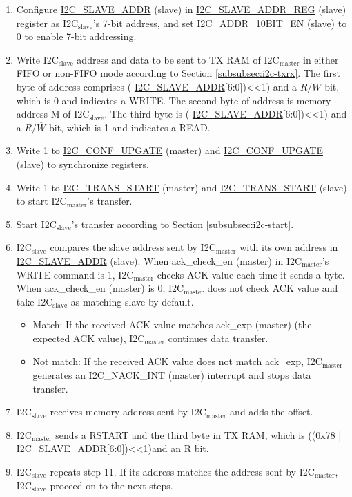 \documentclass[main\_\_EN.tex]{subfiles}
\begin{document}
\begin{enumerate}
\item Configure \hyperref[fielddesc:I2CSLAVEADDR]{I2C\_SLAVE\_ADDR} (slave) in \hyperref[regdesc:I2CSLAVEADDRREG]{I2C\_SLAVE\_ADDR\_REG} (slave) register as I2C$_\text{slave}$'s 7-bit address, and set \hyperref[fielddesc:I2CADDR10BITEN]{I2C\_ADDR\_10BIT\_EN} (slave) to 0 to enable 7-bit addressing.
\item Write I2C$_\text{slave}$ address and data to be sent to TX RAM of I2C$_\text{master}$ in either FIFO or non-FIFO mode according to Section \ref{subsubsec:i2c-txrx}. The first byte of address comprises ( \hyperref[fielddesc:I2CSLAVEADDR]{I2C\_SLAVE\_ADDR}[6:0])<<1) and a $R/\overline W$ bit, which is 0 and indicates a WRITE. The second byte of address is memory address M of I2C$_\text{slave}$. The third byte is ( \hyperref[fielddesc:I2CSLAVEADDR]{I2C\_SLAVE\_ADDR}[6:0])<<1) and a $R/\overline W$ bit, which is 1 and indicates a READ.

\item Write 1 to \hyperref[fielddesc:I2CCONFUPGATE]{I2C\_CONF\_UPGATE} (master) and \hyperref[fielddesc:I2CCONFUPGATE]{I2C\_CONF\_UPGATE} (slave) to synchronize registers.
\item Write 1 to \hyperref[fielddesc:I2CTRANSSTART]{I2C\_TRANS\_START} (master) and \hyperref[fielddesc:I2CTRANSSTART]{I2C\_TRANS\_START} (slave) to start I2C$_\text{master}$'s transfer.
\item Start I2C$_\text{slave}$'s transfer according to Section \ref{subsubsec:i2c-start}.
\item I2C$_\text{slave}$ compares the slave address sent by I2C$_\text{master}$ with its own address in \hyperref[fielddesc:I2CSLAVEADDR]{I2C\_SLAVE\_ADDR} (slave). When ack\_check\_en (master) in I2C$_\text{master}$'s WRITE command is 1, I2C$_\text{master}$ checks ACK value each time it sends a byte. When ack\_check\_en (master) is 0, I2C$_\text{master}$ does not check ACK value and take I2C$_\text{slave}$ as matching slave by default.
\begin{itemize}
\item Match: If the received ACK value matches ack\_exp (master) (the expected ACK value), I2C$_\text{master}$ continues data transfer.
\item Not match: If the received ACK value does not match ack\_exp, I2C$_\text{master}$ generates an I2C\_NACK\_INT (master) interrupt and stops data transfer.
\end{itemize}
\item I2C$_\text{slave}$ receives memory address sent by I2C$_\text{master}$ and adds the offset.
\item I2C$_\text{master}$ sends a RSTART and the third byte in TX RAM, which is ((0x78 | \hyperref[fielddesc:I2CSLAVEADDR]{I2C\_SLAVE\_ADDR}[6:0])<<1)and an R bit.
\item I2C$_\text{slave}$ repeats step 11. If its address matches the address sent by I2C$_\text{master}$, I2C$_\text{slave}$ proceed on to the next steps.


\end{enumerate}
\end{document}
